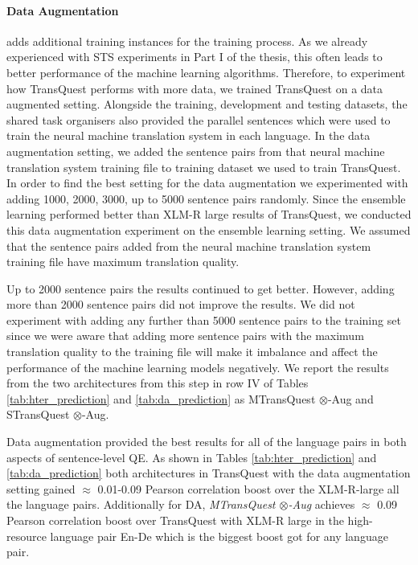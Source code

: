 \paragraph{Data Augmentation} adds additional training instances for the training process. As we already experienced with STS experiments in Part I of the thesis, this often leads to better performance of the machine learning algorithms. Therefore, to experiment how TransQuest performs with more data, we trained TransQuest on a data augmented setting. Alongside the training, development and testing datasets, the shared task organisers also provided the parallel sentences which were used to train the neural machine translation system in each language. In the data augmentation setting, we added the sentence pairs from that neural machine translation system training file to training dataset we used to train TransQuest. In order to find the best setting for the data augmentation we experimented with adding 1000, 2000, 3000, up to 5000 sentence pairs randomly. Since the ensemble learning performed better than XLM-R large results of TransQuest, we conducted this data augmentation experiment on the ensemble learning setting. We assumed that the sentence pairs added from the neural machine translation system training file have maximum translation quality. 

Up to 2000 sentence pairs the results continued to get better. However, adding more than 2000 sentence pairs did not improve the results. We did not experiment with adding any further than 5000 sentence pairs to the training set since we were aware that adding more sentence pairs with the maximum translation quality to the training file will make it imbalance and affect the performance of the machine learning models negatively. We report the results from the two architectures from this step in row IV of Tables \ref{tab:hter_prediction} and \ref{tab:da_prediction} as MTransQuest $\otimes$-Aug and STransQuest $\otimes$-Aug. 

Data augmentation provided the best results for all of the language pairs in both aspects of sentence-level QE. As shown in Tables \ref{tab:hter_prediction} and \ref{tab:da_prediction} both architectures in TransQuest with the data augmentation setting gained $\approx$ 0.01-0.09 Pearson correlation boost over the XLM-R-large all the language pairs. Additionally for DA, \textit{MTransQuest $\otimes$-Aug} achieves $\approx$ 0.09 Pearson correlation boost over TransQuest with XLM-R large in the high-resource language pair En-De which is the biggest boost got for any language pair. 

